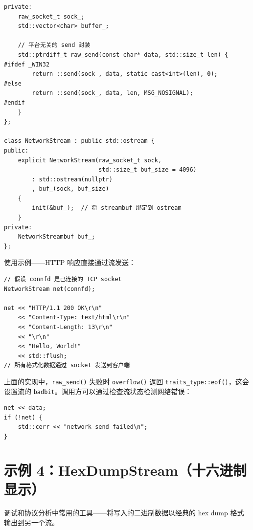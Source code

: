 \documentclass[12pt,a4paper,fontset=fandol]{ctexbook}
\newcommand{\Fn}[1]{\texttt{#1()}}
\newcommand{\Tp}[1]{\texttt{#1}}
\begin{document}
\begin{lstlisting}
private:
    raw_socket_t sock_;
    std::vector<char> buffer_;

    // 平台无关的 send 封装
    std::ptrdiff_t raw_send(const char* data, std::size_t len) {
#ifdef _WIN32
        return ::send(sock_, data, static_cast<int>(len), 0);
#else
        return ::send(sock_, data, len, MSG_NOSIGNAL);
#endif
    }
};

class NetworkStream : public std::ostream {
public:
    explicit NetworkStream(raw_socket_t sock,
                           std::size_t buf_size = 4096)
        : std::ostream(nullptr)
        , buf_(sock, buf_size)
    {
        init(&buf_);  // 将 streambuf 绑定到 ostream
    }
private:
    NetworkStreambuf buf_;
};
\end{lstlisting}

使用示例——HTTP 响应直接通过流发送：

\begin{lstlisting}
// 假设 connfd 是已连接的 TCP socket
NetworkStream net(connfd);

net << "HTTP/1.1 200 OK\r\n"
    << "Content-Type: text/html\r\n"
    << "Content-Length: 13\r\n"
    << "\r\n"
    << "Hello, World!"
    << std::flush;
// 所有格式化数据通过 socket 发送到客户端
\end{lstlisting}

\begin{warning}[title=流中的错误传播]
上面的实现中，\Fn{raw\_send} 失败时 \Fn{overflow} 返回 \Tp{traits\_type::eof()}，这会设置流的 \Tp{badbit}。调用方可以通过检查流状态检测网络错误：

\begin{lstlisting}
net << data;
if (!net) {
    std::cerr << "network send failed\n";
}
\end{lstlisting}
\end{warning}

\section{示例 4：HexDumpStream（十六进制显示）}

调试和协议分析中常用的工具——将写入的二进制数据以经典的 hex dump 格式输出到另一个流。
\end{document}
